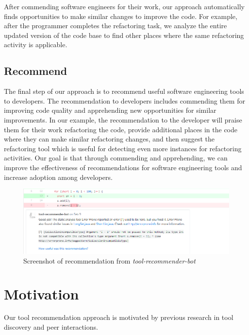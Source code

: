 \documentclass[sigconf,review,anonymous]{acmart}
\newcommand{\tool}{\textsl{tool-recommender-bot}}
\begin{document}
After commending software engineers for their work, our approach automatically finds opportunities to make similar changes to improve the code. For example, after the programmer completes the refactoring task, we analyze the entire updated version of the code base to find other places where the same refactoring activity is applicable. 


\subsection{Recommend}

The final step of our approach is to recommend useful software engineering tools to developers. The recommendation to developers includes commending them for improving code quality and apprehending new opportunities for similar improvements. In our example, the recommendation to the developer will praise them for their work refactoring the code, provide additional places in the code where they can make similar refactoring changes, and then suggest the refactoring tool which is useful for detecting even more instances for refactoring activities. Our goal is that through commending and apprehending, we can improve the effectiveness of recommendations for software engineering tools and increase adoption among developers.

\begin{figure}
	\includegraphics[width=\textwidth]{images/screenshot.png}
	\caption{Screenshot of recommendation from \tool}	
	\label{fig:tool} 
\end{figure}

\section{Motivation}

Our tool recommendation approach is motivated by previous research in tool discovery and peer interactions.
\end{document}
